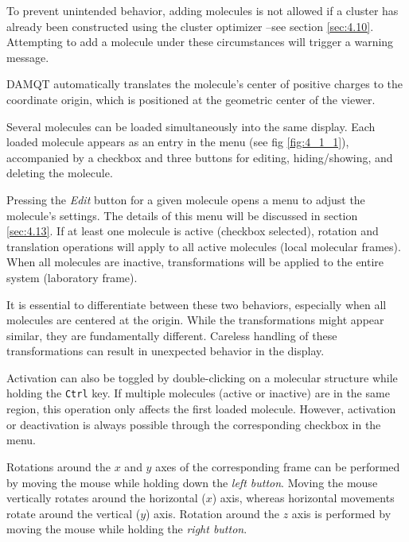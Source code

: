 \documentclass[10pt]{article}
\begin{document}
To prevent unintended behavior, adding molecules is not allowed if a cluster has already been  
constructed using the cluster optimizer --see section \ref{sec:4.10}.  
Attempting to add a molecule under these circumstances will trigger a warning message.  

DAMQT automatically translates the molecule's center of positive charges to the coordinate origin,  
which is positioned at the geometric center of the viewer.  

\vspace*{5mm}{\bf Managing Multiple Molecules}\vspace*{5mm}  

Several molecules can be loaded simultaneously into the same display. Each loaded molecule appears  
as an entry in the menu (see fig \ref{fig:4_1_1}), accompanied by a checkbox and three buttons  
for editing, hiding/showing, and deleting the molecule.  

Pressing the {\it Edit} button for a given molecule opens a menu  
to adjust the molecule’s settings. The details of this menu will be discussed in section \ref{sec:4.13}.  
If at least one molecule is active (checkbox selected), rotation and translation operations  
will apply to all active molecules (local molecular frames).  
When all molecules are inactive, transformations will be applied to the entire system  
(laboratory frame).  

It is essential to differentiate between these two behaviors, especially when all molecules  
are centered at the origin. While the transformations might appear similar, they are fundamentally  
different. Careless handling of these transformations can result in unexpected behavior in the display.  

Activation can also be toggled by double-clicking  
on a molecular structure while holding the \texttt{Ctrl} key.  
If multiple molecules (active or inactive) are in the same region, this operation only affects  
the first loaded molecule. However, activation or deactivation is always possible  
through the corresponding checkbox in the menu.  

\vspace*{5mm}{\bf Rotations and Translations}\vspace*{5mm}  

Rotations  
around the $x$ and $y$ axes of the corresponding frame can be performed  
by moving the mouse while holding down the {\it left button}.  
Moving the mouse vertically rotates around the horizontal ($x$) axis,  
whereas horizontal movements rotate around the vertical ($y$) axis.  
Rotation around the $z$ axis is performed by moving the mouse while holding the {\it right button}.  
\end{document}
